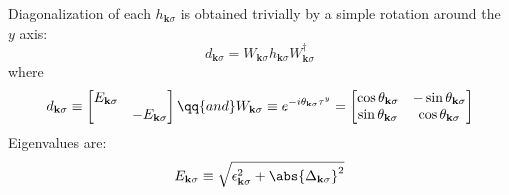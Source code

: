 Diagonalization of each $h_{\mathbf{k}\sigma}$ is obtained trivially by a simple rotation around the $y$ axis:
\[
	d_{\mathbf{k}\sigma} = W_{\mathbf{k}\sigma} h_{\mathbf{k}\sigma} W_{\mathbf{k}\sigma}^\dagger
\]
where
\[
	d_{\mathbf{k}\sigma} \equiv \begin{bmatrix}
		E_{\mathbf{k}\sigma} & \\
		& - E_{\mathbf{k}\sigma}
	\end{bmatrix}
	\qq{and}
	W_{\mathbf{k}\sigma} \equiv e^{-i \theta_{\mathbf{k}\sigma} 
	\tau^y} = \begin{bmatrix}
		\cos \theta_{\mathbf{k}\sigma} & - \sin \theta_{\mathbf{k}\sigma} \\
		\sin \theta_{\mathbf{k}\sigma} & \cos \theta_{\mathbf{k}\sigma}
	\end{bmatrix}
\]
Eigenvalues are:
\begin{equation}\label{appeq:af-bands}
	E_{\mathbf{k}\sigma} \equiv \sqrt{
		\epsilon_{\mathbf{k}\sigma}^2 + \abs{\Delta_{\mathbf{k}\sigma}}^2
	}
\end{equation}

